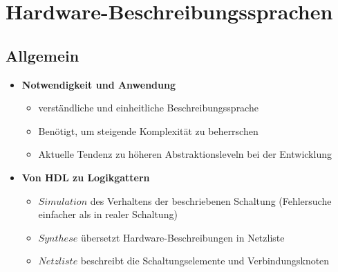 
\section{Hardware-Beschreibungssprachen}


\subsection{Allgemein}
\begin{itemize}

\item \textbf{Notwendigkeit und Anwendung}
	\begin{itemize}
	\item verständliche und einheitliche Beschreibungssprache
	\item Benötigt, um steigende Komplexität zu beherrschen
	\item Aktuelle Tendenz zu höheren Abstraktionsleveln bei der Entwicklung
	\end{itemize}
	
\item \textbf{Von HDL zu Logikgattern}
	\begin{itemize}
	\item $Simulation$ des Verhaltens der beschriebenen Schaltung (Fehlersuche einfacher als in realer Schaltung)
	\item $Synthese$ übersetzt Hardware-Beschreibungen in Netzliste
	\item $Netzliste$ beschreibt die Schaltungselemente und Verbindungsknoten
	\end{itemize}
\end{itemize}

